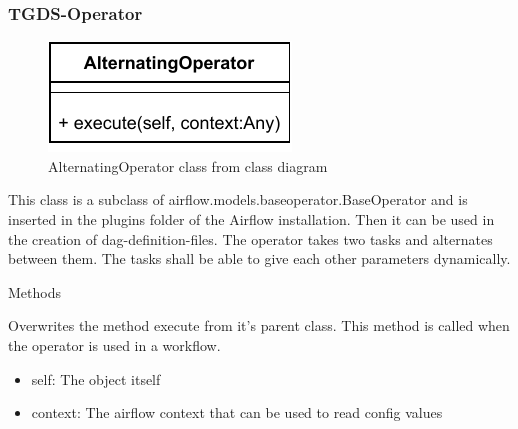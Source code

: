 \subsubsection{TGDS-Operator}


\begin{figure}[h]
\centerline{\includegraphics[scale=1]{res/Klassen/AlternatingOperator.pdf}}
\caption{AlternatingOperator class from class diagram}
\end{figure}

This class is a subclass of airflow.models.baseoperator.BaseOperator and is inserted in the plugins folder of the Airflow installation. Then it can be used in the creation of dag-definition-files. The operator takes two tasks and alternates between them. The tasks shall be able to give each other parameters dynamically.

\begin{methodenv}{Methods}

Overwrites the method execute from it's parent class. This method is called when the operator is used in a workflow. 

\begin{itemize}
	\item{self:}
	The object itself
	\item{context:}
	The airflow context that can be used to read config values
\end{itemize}

\end{methodenv}
